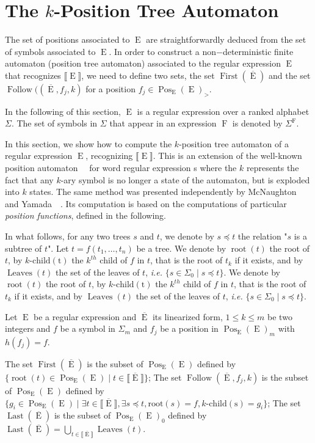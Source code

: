 \documentclass{llncs}
\DeclareMathOperator{\Pos}{Pos}
\DeclareMathOperator{\Last}{Last}
\DeclareMathOperator{\First}{First}
\DeclareMathOperator{\Follow}{Follow}
\DeclareMathOperator{\Leave}{Leaves}
\DeclareMathOperator{\E}{E}
\DeclareMathOperator{\f}{F}
\def\b#1{\overline{#1}}
\DeclareMathOperator{\rooot}{root}
\def\first#1{\First{(#1)}}
\def\Po#1#2{\Pos_{#1}{(#2)}}
\begin{document}
\section{The $k$-Position Tree Automaton}\label{sec automata}

The set of positions associated to $\E$ are straightforwardly deduced from the set of symbols associated to $\E$. 
In order to construct a non$-$deterministic finite automaton (position tree automaton) associated to the 
regular expression  $\E$ that recognizes $\llbracket \E\rrbracket$,
we need to define two sets, the set $\first{\b\E}$ and the set $\Follow((\b\E,f_j,k)$ for a position $f_j\in \Po{\E}{\E}_{>}$.


  In the following of this section, $\E$ is a regular expression  over a ranked alphabet $\Sigma$. 
  The set of symbols in $\Sigma$ that appear in an expression $\f$ is denoted by $\Sigma^{\f}$.


  In this section, we show how to compute the $k$-position tree automaton of a regular expression   $\E$, recognizing $\llbracket \E\rrbracket$. This is an extension of the well-known position automaton~~\cite{glushkov} for word regular expression  s where the $k$ represents the fact that any $k$-ary symbol is no longer a state of the automaton, but is exploded into $k$ states.
  The same method was presented independently by McNaughton and Yamada~~\cite{mcnaughton60}.  
   Its computation is based on the computations of particular \emph{position functions}, defined in the following.
  
  In what follows, for any two trees $s$ and $t$, we denote by $s \preccurlyeq t$ the relation "$s$ is a subtree of $t$".
  Let $t=f(t_1,\dots,t_n)$ be a tree. 
We denote by $\rooot(t)$ the root of $t$, by $k\mbox{-}\mathrm{child(t)}$ the $k^{th}$ child of $f$ in $t$, that is the root of $t_k$ if it exists, and by $\Leave(t)$ the set of the leaves of $t$, \emph{i.e.} $\{s\in \Sigma_0\mid s\preccurlyeq t\}$. 
  We denote by $\rooot(t)$ the root of $t$, by $k\mbox{-}\mathrm{child(t)}$ the $k^{th}$ child of $f$ in $t$, that is the root of $t_k$ if it exists, and by $\Leave(t)$ the set of the leaves of $t$, \emph{i.e.} $\{s\in \Sigma_0\mid s\preccurlyeq t\}$. 
  
  Let $\E$ be a regular expression  and $\b\E$ its linearized form, $1\leq k\leq m$ be two integers and $f$ be a symbol in $\Sigma_m$ and $f_j$ be a position in $\Po{\E}{\E}_m$ with $h(f_j)=f$.

  The set $\First(\b\E)$ is the subset of $\Po{\E}{\E}$ defined by $\{\rooot(t)\in \Po{\E}{\E} \mid t\in \llbracket\b\E \rrbracket\}$; The set $\Follow(\b\E,f_j,k)$ is the subset of $\Po{\E}{\E}$ defined by $\{g_i\in \Po{\E}{\E} \mid \exists t\in \llbracket \b\E \rrbracket, \exists s\preccurlyeq t, \mathrm{root}(s)=f, k\mbox{-}\mathrm{child(s)}=g_i\}$; The set $\Last(\b\E)$ is the subset of $\Po{\E}{\E}_0$ defined by $\Last(\b\E)=\displaystyle\bigcup_{t\in\llbracket \b\E\rrbracket}\Leave(t)$.
  
\end{document}
